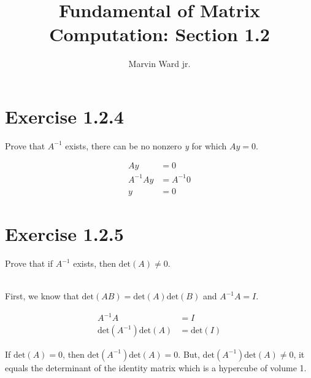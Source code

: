 \documentclass[10pt]{article}
\begin{document}
    \title{Fundamental of Matrix Computation: Section 1.2}
    \author{Marvin Ward jr.}
    \maketitle

    \section{Exercise 1.2.4}
    Prove that \begin{math}A^{-1}\end{math} exists, there can be no nonzero \emph{y} for which \begin{math}Ay=0
    \end{math}.

    \noindent\makebox[\linewidth]{\rule{\textwidth}{0.2pt}}

    \begin{align}
        A y &= 0 \\
        A^{-1} A y &= A^{-1} 0 \\
        y &= 0
    \end{align}


    \section{Exercise 1.2.5}
    Prove that if \begin{math}A^{-1}\end{math} exists, then \begin{math} \text{det}(A) \neq 0\end{math}.

    \noindent\makebox[\linewidth]{\rule{\textwidth}{0.2pt}} \\

    First, we know that \begin{math} \text{det}(AB) = \text{det}(A) \text{det}(B)\end{math} and
    \begin{math} A^{-1} A = I\end{math}.

    \begin{align}
        A^{-1} A &= I \\
        \text{det}(A^{-1}) \text{det}(A) &= \text{det}(I)
    \end{align}

    If \begin{math}\text{det}(A) = 0\end{math}, then \begin{math}\text{det}(A^{-1}) \text{det}(A) = 0\end{math}. But,
    \begin{math}\text{det}(A^{-1}) \text{det}(A) \neq 0\end{math}, it equals the determinant of the identity matrix which
    is a hypercube of volume 1.
\end{document}

